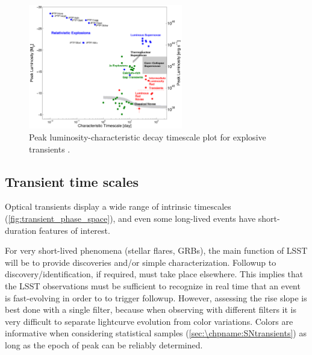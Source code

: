 \begin{figure}[hbt]
\centerline{
\includegraphics[width=0.6\textwidth]{figs/transients/taumv_2014.pdf}
}
\caption{
Peak luminosity-characteristic decay timescale plot for explosive
transients \citep[adapted from][]{2011PhDT........35K}.
}
\label{fig:transient_phase_space}
\end{figure}





%




\subsection{Transient time scales}

Optical transients display a wide range of intrinsic timescales
(\autoref{fig:transient_phase_space}), and even some long-lived events
have short-duration features of interest.

For very short-lived phenomena (stellar flares, GRBs),
the main function of LSST will be to provide discoveries and/or simple
characterization.  Followup to discovery/identification, if required,
must take place elsewhere. This implies that the LSST observations
must be sufficient to recognize in real time that an event is fast-evolving
in order to to trigger followup. However, assessing the rise
slope is best done with a single filter,
because when observing with different
filters it is very difficult to separate lightcurve evolution from
color variations. Colors are informative when considering statistical
samples (\autoref{sec:\chpname:SNtransients}) as long as the epoch of peak
can be reliably determined.

